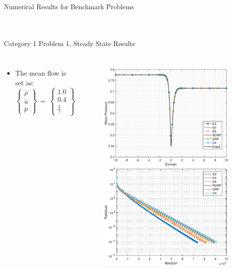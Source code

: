 \begin{frame}{Numerical Results for Benchmark Problems}
\begin{columns}
\begin{figure}[hbt!]
          \label{fig:Euler_CD_Area}
      \end{figure}
  \end{columns}
\end{frame}

\begin{frame}{Category 1 Problem 1, Steady State Results}
  \begin{columns}
    \begin{itemize}
      \item The mean flow is set as:
      \begin{equation*}
        \left\{
      	\begin{matrix}
      		\overline{\rho} \\
      		\overline{u} \\
      		\overline{p}
      	\end{matrix}
      	\right\}~=~
      	\left\{
      	\begin{matrix}
      		1.0 \\
      		0.4 \\
      		\frac{1}{\gamma}
      	\end{matrix}
      	\right\}
      \end{equation*}
    \end{itemize}
    \begin{figure}
      \includegraphics[width=0.48\linewidth]{Figures/C1P1_SteadyState}%
      \includegraphics[width=0.48\linewidth]{Figures/C1P1_TriDi_Scaling_ROC}
    \end{figure}
  \end{columns}
\end{frame}

